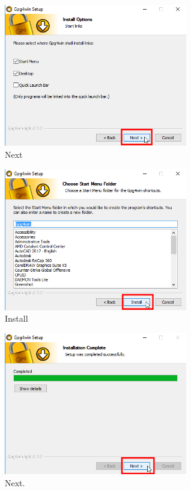 \documentclass[a4paper,11pt]{article}
\begin{document}
\begin{figure}[!h]
	\begin{center}
		\includegraphics[width=8cm]{11_Gpg4win_Setup.png}
		\caption{Next}
		\label{initialscreen}
	\end{center}
\end{figure}
\newpage
\begin{figure}[!h]
	\begin{center}
		\includegraphics[width=8cm]{12_Gpg4win_Setup.png}
		\caption{Install}
		\label{initialscreen}
	\end{center}
\end{figure}
\begin{figure}[!h]
	\begin{center}
		\includegraphics[width=8cm]{14_Gpg4win_Setup.png}
		\caption{Next.}
		\label{initialscreen}
	\end{center}
\end{figure}
\end{document}
